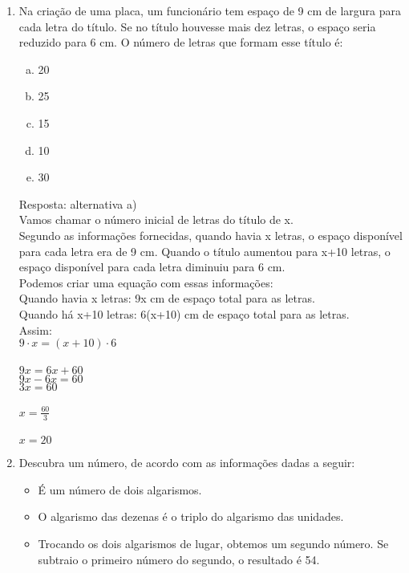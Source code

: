 \documentclass[a4paper,14pt]{article}
\begin{document}
\begin{multicols}{2}
\begin{enumerate}
        \item Na criação de uma placa, um funcionário tem espaço de 9 cm de largura para cada letra do título. Se no título houvesse mais dez letras, o espaço seria reduzido para 6 cm. O número de letras que formam esse título é:
        \begin{enumerate}[a)]
        	\item 20
        	\item 25
        	\item 15
        	\item 10
        	\item 30
        \end{enumerate}
    
        Resposta: alternativa a) \\
        
        Vamos chamar o número inicial de letras do título de x.\\
        
        Segundo as informações fornecidas, quando havia x letras, o espaço disponível para cada letra era de 9 cm. Quando o título aumentou para x+10 letras, o espaço disponível para cada letra diminuiu para 6 cm.\\
        
        Podemos criar uma equação com essas informações:\\
        
        Quando havia x letras: 9x cm de espaço total para as letras.\\
        
        Quando há x+10 letras: 6(x+10) cm de espaço total para as letras. \\
        
        Assim:\\
        $9 \cdot x=(x+10) \cdot 6$\\\\
         
        $9x=6x+60$ \\
        $9x-6x=60$ \\
        $3x=60$ \\ \\
        $x = \frac{60}{3}$\\ \\
        $x=20$ \\
        
        \item Descubra um número, de acordo com as informações dadas a seguir:
        \begin{itemize}
        	\item É um número de dois algarismos.
        	\item O algarismo das dezenas é o triplo do algarismo das unidades.
        	\item Trocando os dois algarismos de lugar, obtemos um segundo número. Se subtraio o primeiro número do segundo, o resultado é 54.
        \end{itemize}
    

\end{enumerate}
\end{multicols}
\end{document}
